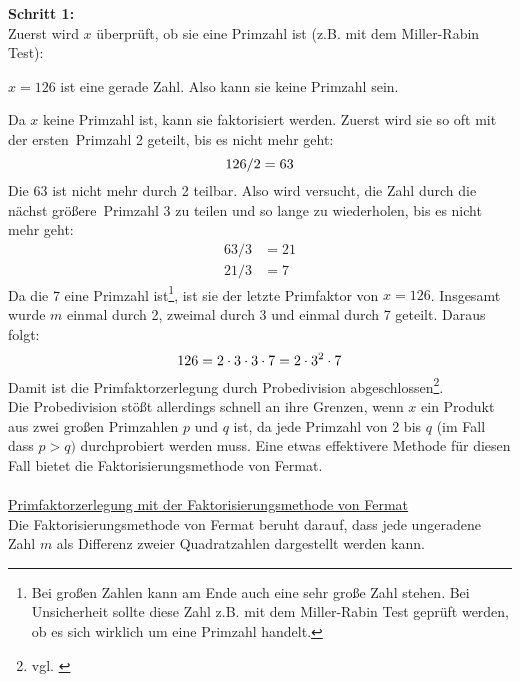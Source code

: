 \textbf{Schritt 1:} \\
Zuerst wird $x$ überprüft, ob sie eine Primzahl ist (z.B. mit dem Miller-Rabin Test):
\begin{center}
$x=126$ ist eine gerade Zahl. Also kann sie keine Primzahl sein.
\end{center}
Da $x$ keine Primzahl ist, kann sie faktorisiert werden. Zuerst wird sie so oft mit der \glqq ersten\grqq~Primzahl 2 geteilt, bis es nicht mehr geht:
\begin{equation*}
126/2=63\\
\end{equation*}
Die 63 ist nicht mehr durch 2 teilbar. Also wird versucht, die Zahl durch die \glqq nächst größere\grqq~Primzahl 3 zu teilen und so lange zu wiederholen, bis es nicht mehr geht:
\begin{align*}
63/3&=21\\
21/3&=7
\end{align*}
Da die 7 eine Primzahl ist\footnote{Bei großen Zahlen kann am Ende auch eine sehr große Zahl stehen. Bei Unsicherheit sollte diese Zahl z.B. mit dem Miller-Rabin Test geprüft werden, ob es sich wirklich um eine Primzahl handelt.}, ist sie der letzte Primfaktor von $x=126$. Insgesamt wurde $m$ einmal durch 2, zweimal durch 3 und einmal durch 7 geteilt. Daraus folgt:\\
\begin{equation*}
126=2\cdot3\cdot3\cdot7=2\cdot3^{2}\cdot7\\
\end{equation*}
Damit ist die Primfaktorzerlegung durch Probedivision abgeschlossen\footnote{vgl. \cite{faktorisierung}}.\\
Die Probedivision stößt allerdings schnell an ihre Grenzen, wenn $x$ ein Produkt aus zwei großen Primzahlen $p$ und $q$ ist, da jede Primzahl von 2 bis $q$ (im Fall dass $p>q)$ durchprobiert werden muss. Eine etwas effektivere Methode für diesen Fall bietet die Faktorisierungsmethode von Fermat.\\ 
\\
\underline{Primfaktorzerlegung mit der Faktorisierungsmethode von Fermat}\\
Die Faktorisierungsmethode von Fermat beruht darauf, dass jede ungeradene Zahl $m$ als Differenz zweier Quadratzahlen dargestellt werden kann.

